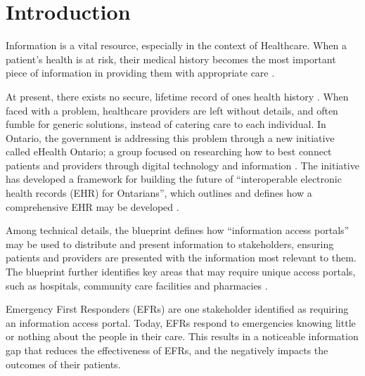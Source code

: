 
\section{Introduction}

Information is a vital resource, especially in the context of Healthcare. When a patient's health is at risk, their medical history becomes the most important piece of information in providing them with appropriate care \cite{web1}.

At present, there exists no secure, lifetime record of ones health history \cite{Street2014}. When faced with a problem, healthcare providers are left without details, and often fumble for generic solutions, instead of catering care to each individual. In Ontario, the government is addressing this problem through a new initiative called eHealth Ontario; a group focused on researching how to best connect patients and providers through digital technology and information \cite{web1}. The initiative has developed a framework for building the future of ``interoperable electronic health records (EHR) for Ontarians'', which outlines and defines how a comprehensive EHR may be developed \cite{b1}.

Among technical details, the blueprint defines how ``information access portals'' may be used to distribute and present information to stakeholders, ensuring patients and providers are presented with the information most relevant to them. The blueprint further identifies key areas that may require unique access portals, such as hospitals, community care facilities and pharmacies \cite{Street2014}.

Emergency First Responders (EFRs) are one stakeholder identified as requiring an information access portal. Today, EFRs respond to emergencies knowing little or nothing about the people in their care. This results in a noticeable information gap that reduces the effectiveness of EFRs, and the negatively impacts the outcomes of their patients. \iffalse reducing the effectiveness of EFRs, and   during treatment. This is unfortunate, considering how beneficial information is in improving patient outcomes. \fi

